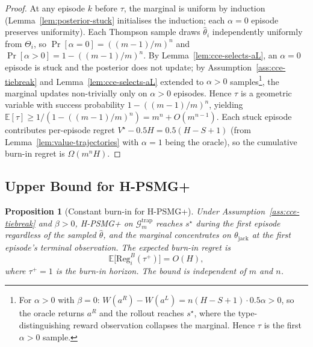 \documentclass{article}
\newtheorem{proposition}[theorem]{Proposition}
\def\textsuperscript#1{#1}%
\begin{document}
\begin{proof}
At any episode $k$ before $\tau$, the marginal is uniform by induction (Lemma~\ref{lem:posterior-stuck} initialises the induction; each $\alpha = 0$ episode preserves uniformity). Each Thompson sample draws $\hat\theta_i$ independently uniformly from $\Theta_i$, so $\Pr[\alpha = 0] = ((m-1)/m)^n$ and $\Pr[\alpha > 0] = 1 - ((m-1)/m)^n$. By Lemma~\ref{lem:cce-selects-aL}, an $\alpha = 0$ episode is stuck and the posterior does not update; by Assumption~\ref{ass:cce-tiebreak} and Lemma~\ref{lem:cce-selects-aL} extended to $\alpha > 0$ samples\footnote{For $\alpha > 0$ with $\beta = 0$: $W(a^R) - W(a^L) = n(H - S + 1) \cdot 0.5\alpha > 0$, so the oracle returns $a^R$ and the rollout reaches $s^\star$, where the type-distinguishing reward observation collapses the marginal. Hence $\tau$ is the first $\alpha > 0$ sample.}, the marginal updates non-trivially only on $\alpha > 0$ episodes. Hence $\tau$ is a geometric variable with success probability $1 - ((m-1)/m)^n$, yielding $\mathbb{E}[\tau] \geq 1/(1 - ((m-1)/m)^n) = m^n + O(m^{n-1})$. Each stuck episode contributes per-episode regret $V^\star - 0.5 H = 0.5(H - S + 1)$ (from Lemma~\ref{lem:value-trajectories} with $\alpha = 1$ being the oracle), so the cumulative burn-in regret is $\Omega(m^n H)$.
\end{proof}

\subsection{Upper Bound for H-PSMG\textsuperscript{+}}
\label{app:hpsmg-plus-upper}

\begin{proposition}[Constant burn-in for H-PSMG\textsuperscript{+}]
\label{prop:hpsmg-plus-burnin}
Under Assumption~\ref{ass:cce-tiebreak} and $\beta > 0$, H-PSMG\textsuperscript{+} on $\mathcal{G}_m^{\mathrm{trap}}$ reaches $s^\star$ during the first episode regardless of the sampled $\hat\theta$, and the marginal concentrates on $\theta_{\mathrm{jack}}$ at the first episode's terminal observation. The expected burn-in regret is
\begin{equation}
\mathbb{E}\big[\mathrm{Reg}_i^B(\tau^+)\big] = O(H),
\end{equation}
where $\tau^+ = 1$ is the burn-in horizon. The bound is independent of $m$ and $n$.
\end{proposition}
\end{document}

